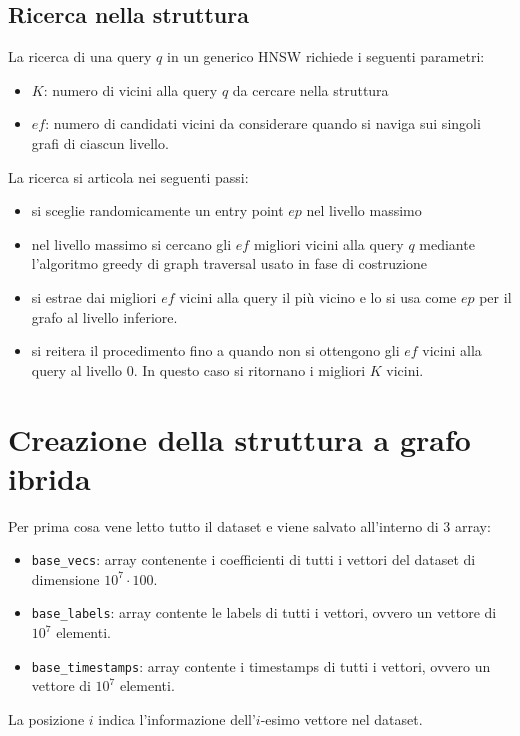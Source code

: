 \subsection{Ricerca nella struttura}
La ricerca di una query $q$ in un generico HNSW richiede i seguenti parametri:
\begin{itemize}
    \item $K$: numero di vicini alla query $q$ da cercare nella struttura
    \item $ef$: numero di candidati vicini da considerare quando si naviga sui singoli 
    grafi di ciascun livello.
\end{itemize}

La ricerca si articola nei seguenti passi:
\begin{itemize}
    \item si sceglie randomicamente un entry point $ep$ nel livello massimo
    \item nel livello massimo si cercano gli $ef$ migliori vicini alla query 
    $q$ mediante l'algoritmo greedy di graph traversal usato in fase di costruzione
    \item si estrae dai migliori $ef$ vicini alla query il più vicino e lo si usa 
    come $ep$ per il grafo al livello inferiore.
    \item si reitera il procedimento fino a quando non si ottengono gli $ef$ vicini 
    alla query al livello $0$. In questo caso si ritornano i migliori $K$ vicini.
\end{itemize}  

\section{Creazione della struttura a grafo ibrida}
Per prima cosa vene letto tutto il dataset e viene salvato
all'interno di $3$ array:
\begin{itemize}
    \item \texttt{base\_vecs}: array contenente i coefficienti di tutti i vettori del dataset
    di dimensione $10^7\cdot 100$.
    \item \texttt{base\_labels}: array contente le labels di tutti i vettori, ovvero un 
    vettore di $10^7$ elementi.
    \item \texttt{base\_timestamps}: array contente i timestamps di tutti i vettori, ovvero un 
    vettore di $10^7$ elementi.
\end{itemize} 

\begin{nota}
    La posizione $i$ indica  l'informazione dell'$i$-esimo vettore nel dataset.
\end{nota}

